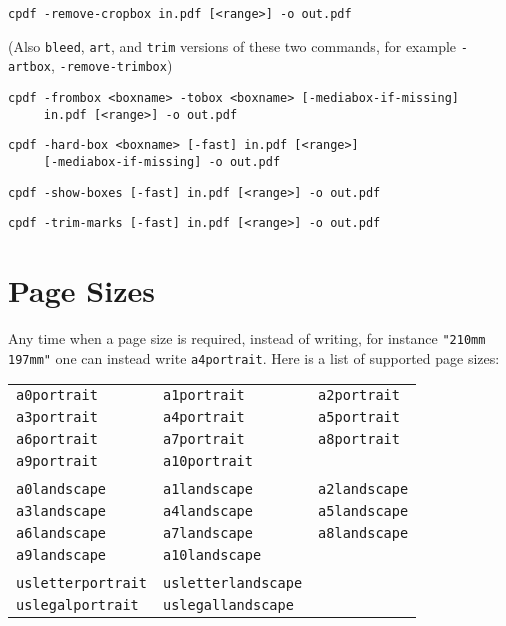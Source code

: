\documentclass{book}
\newcommand{\smallgap}{\bigskip}
\begin{document}
\begin{framed}
  \vspace{1.5mm}
  \small\noindent\verb!cpdf -remove-cropbox in.pdf [<range>] -o out.pdf!

  \vspace{1.5mm}
  (Also \texttt{bleed}, \texttt{art}, and \texttt{trim} versions of these two commands, for example  \texttt{-artbox}, \texttt{-remove-trimbox})

  \vspace{1.5mm}
  \small\noindent\verb!cpdf -frombox <boxname> -tobox <boxname> [-mediabox-if-missing]! \\
  \noindent\verb!     in.pdf [<range>] -o out.pdf!

  \vspace{1.5mm}
  \small\noindent\verb!cpdf -hard-box <boxname> [-fast] in.pdf [<range>]!\\
  \small\noindent\verb!     [-mediabox-if-missing] -o out.pdf!

  \vspace{1.5mm}
  \small\noindent\verb!cpdf -show-boxes [-fast] in.pdf [<range>] -o out.pdf!

  \vspace{1.5mm}
  \small\noindent\verb!cpdf -trim-marks [-fast] in.pdf [<range>] -o out.pdf!

  \end{framed}

  \section{Page Sizes}
\label{papersizes}
  Any time when a page size is required, instead of writing, for instance \texttt{"210mm 197mm"} one can instead write \texttt{a4portrait}. Here is a list of supported page sizes:

{\small
  \smallgap
  \begin{tabular}{lll}
  \texttt{a0portrait} & \texttt{a1portrait} & \texttt{a2portrait} \\
  \texttt{a3portrait} & \texttt{a4portrait} & \texttt{a5portrait} \\
  \texttt{a6portrait} & \texttt{a7portrait} & \texttt{a8portrait} \\
  \texttt{a9portrait} & \texttt{a10portrait} & \\
  \\
  \texttt{a0landscape} & \texttt{a1landscape} & \texttt{a2landscape} \\
  \texttt{a3landscape} & \texttt{a4landscape} & \texttt{a5landscape} \\
  \texttt{a6landscape} & \texttt{a7landscape} & \texttt{a8landscape} \\
  \texttt{a9landscape} & \texttt{a10landscape} & \\
  \\
  \texttt{usletterportrait} & \texttt{usletterlandscape} & \\
  \texttt{uslegalportrait} & \texttt{uslegallandscape} &
  \end{tabular}
}
\end{document}
